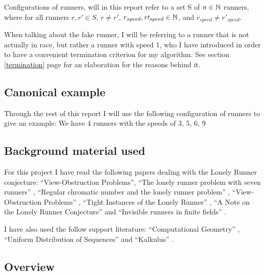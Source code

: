 \begin{defi}
\label{def:config}
Configurations of runners, will in this report refer to a set S of $n \in \mathbb{N}$ runners, where for all runners $r, r\prime \in S$, $r \neq r\prime$, $r_{speed}, r\prime_{speed} \in \mathbb{N}$, and $r_{speed} \neq r\prime_{speed}$.
\end{defi}

\begin{defi}
\label{def:fakeRunner}
When talking about the fake runner, I will be referring to a runner that is not actually in race, but rather a runner with speed 1, who I have introduced in order to have a convenient termination criterion for my algorithm. See section \ref{termination} page \pageref{termination} for an elaboration for the reasons behind it.
\end{defi}  

\subsection{Canonical example}
Through the rest of this report I will use the following configuration
of runners to give an example:
We have 4 runners with the speeds of 3, 5, 6, 9

\subsection{Background material used}
\label{background}
For this project I have read the following papers dealing with the Lonely Runner conjecture: ``View-Obstruction Problems''\cite{Bienia97flows.view-obstructions}, ``The lonely runner problem with seven runners'' \cite{serra_thelonely}, ``Regular chromatic number and the lonely runner problem'' \cite{Barajas2007479}, ``View-Obstruction Problems'' \cite{springerlink:10.1007/BF01832623}, ``Tight Instances of the Lonely Runner'' \cite{Goddyn96tightinstances}, ``A Note on the Lonely Runner Conjecture'' \cite{ANote} and ``Invisible runners in finite fields'' \cite{invis}.

I have also used the follow support literature:
``Computational Geometry'' \cite{citeulike:3347056}, ``Uniform Distribution of Sequences'' \cite{uniform} and ``Kalkulus'' \cite{kalkulus}.

\subsection{Overview}


